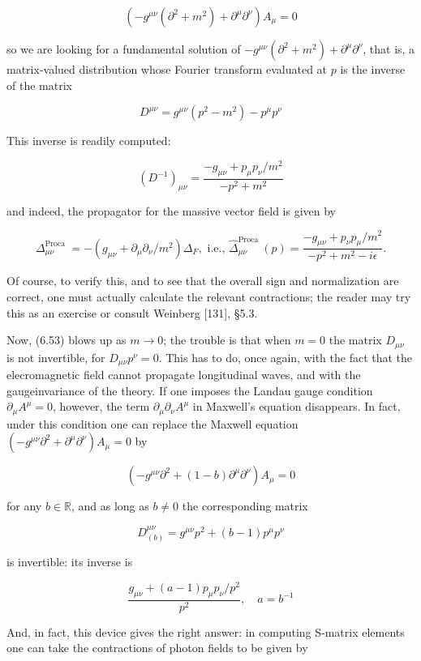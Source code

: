 \documentclass[10pt, letterpaper]{article}
\begin{document}
$$
\left(-g^{\mu \nu}\left(\partial^{2}+m^{2}\right)+\partial^{\mu} \partial^{\nu}\right) A_{\mu}=0
$$

so we are looking for a fundamental solution of $-g^{\mu \nu}\left(\partial^{2}+m^{2}\right)+\partial^{\mu} \partial^{\nu}$, that is, a matrix-valued distribution whose Fourier transform evaluated at $p$ is the inverse of the matrix

$$
D^{\mu \nu}=g^{\mu \nu}\left(p^{2}-m^{2}\right)-p^{\mu} p^{\nu}
$$

This inverse is readily computed:

$$
\left(D^{-1}\right)_{\mu \nu}=\frac{-g_{\mu \nu}+p_{\mu} p_{\nu} / m^{2}}{-p^{2}+m^{2}}
$$

and indeed, the propagator for the massive vector field is given by

$$
\Delta_{\mu \nu}^{\text {Proca }}=-\left(g_{\mu \nu}+\partial_{\mu} \partial_{\nu} / m^{2}\right) \Delta_{F}, \text { i.e., } \widehat{\Delta}_{\mu \nu}^{\text {Proca }}(p)=\frac{-g_{\mu \nu}+p_{\nu} p_{\mu} / m^{2}}{-p^{2}+m^{2}-i \epsilon} .
$$

Of course, to verify this, and to see that the overall sign and normalization are correct, one must actually calculate the relevant contractions; the reader may try this as an exercise or consult Weinberg [131], §5.3.

Now, (6.53) blows up as $m \rightarrow 0$; the trouble is that when $m=0$ the matrix $D_{\mu \nu}$ is not invertible, for $D_{\mu \nu} p^{\nu}=0$. This has to do, once again, with the fact that the elecromagnetic field cannot propagate longitudinal waves, and with the gaugeinvariance of the theory. If one imposes the Landau gauge condition $\partial_{\mu} A^{\mu}=0$, however, the term $\partial_{\mu} \partial_{\nu} A^{\mu}$ in Maxwell's equation disappears. In fact, under this condition one can replace the Maxwell equation $\left(-g^{\mu \nu} \partial^{2}+\partial^{\mu} \partial^{\nu}\right) A_{\mu}=0$ by

$$
\left(-g^{\mu \nu} \partial^{2}+(1-b) \partial^{\mu} \partial^{\nu}\right) A_{\mu}=0
$$

for any $b \in \mathbb{R}$, and as long as $b \neq 0$ the corresponding matrix

$$
D_{(b)}^{\mu \nu}=g^{\mu \nu} p^{2}+(b-1) p^{\mu} p^{\nu}
$$

is invertible: its inverse is

$$
\frac{g_{\mu \nu}+(a-1) p_{\mu} p_{\nu} / p^{2}}{p^{2}}, \quad a=b^{-1}
$$

And, in fact, this device gives the right answer: in computing S-matrix elements one can take the contractions of photon fields to be given by
\end{document}
